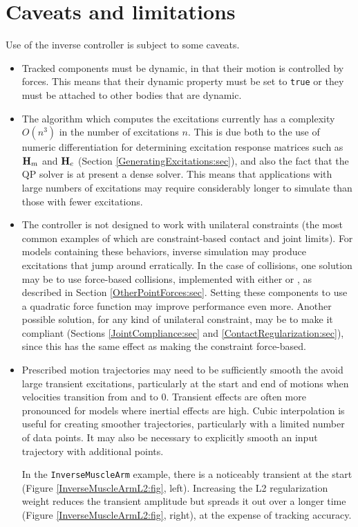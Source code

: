 \section{Caveats and limitations}

Use of the inverse controller is subject to some caveats.

\begin{itemize}

\item Tracked components must be dynamic, in that their
motion is controlled by forces. This means that their {\sf dynamic} property
must be set to {\tt true} or they must be attached to other bodies that are
dynamic.

\item The algorithm which computes the excitations currently
has a complexity $O(n^3)$ in the number of excitations $n$.  This is due both
to the use of numeric differentiation for determining excitation response
matrices such as ${\bf H}_m$ and ${\bf H}_e$ (Section
\ref{GeneratingExcitations:sec}), and also the fact that the QP solver
is at present a dense solver. This means that applications with large numbers
of excitations may require considerably longer to simulate than those with
fewer excitations.

\item The controller is not designed to work with
unilateral constraints (the most common examples of which are constraint-based
contact and joint limits). For models containing these behaviors, inverse
simulation may produce excitations that jump around erratically.  In the case
of collisions, one solution may be to use force-based collisions, implemented
with either
 or
, as described in Section
\ref{OtherPointForces:sec}. Setting these components to
use a quadratic force function may improve performance even more.  Another
possible solution, for any kind of unilateral constraint, may be to make it
compliant (Sections \ref{JointCompliance:sec}
and \ref{ContactRegularization:sec}), since this has the same effect as making
the constraint force-based.

\item Prescribed motion trajectories may need to be sufficiently
smooth the avoid large transient excitations, particularly at the start and end
of motions when velocities transition from and to 0. Transient effects are
often more pronounced for models where inertial effects are high.  Cubic
interpolation is useful for creating smoother trajectories, particularly with a
limited number of data points. It may also be necessary to explicitly smooth an
input trajectory with additional points.

In the {\tt InverseMuscleArm} example, there is a noticeably transient at the
start (Figure \ref{InverseMuscleArmL2:fig}, left). Increasing the L2
regularization weight reduces the transient amplitude but spreads it out over a
longer time (Figure \ref{InverseMuscleArmL2:fig}, right), at the expense of
tracking accuracy.

\end{itemize}

%
\ifdefined\maindoc
\else

\fi
